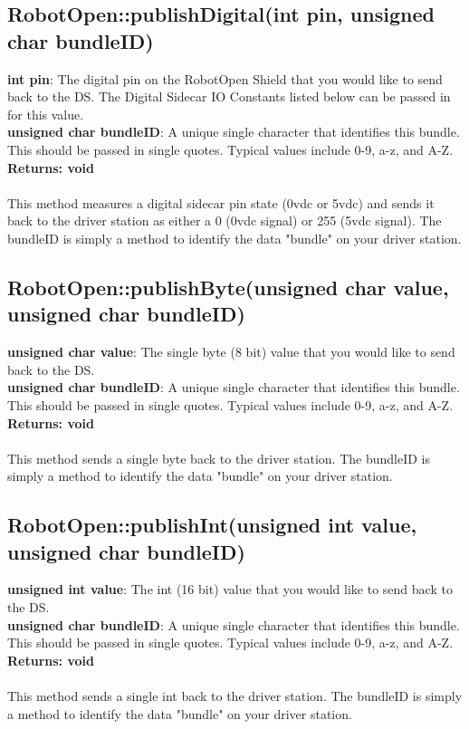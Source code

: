 \documentclass[11pt]{article} %
\begin{document}
\subsection{RobotOpen::publishDigital(int pin, unsigned char bundleID)}
\textbf{int pin}: The digital pin on the RobotOpen Shield that you would like to send back to the DS. The Digital Sidecar IO Constants listed below can be passed in for this value.\\
\textbf{unsigned char bundleID}: A unique single character that identifies this bundle. This should be passed in single quotes. Typical values include 0-9, a-z, and A-Z.\\
\textbf{Returns: void}\\\\
This method measures a digital sidecar pin state (0vdc or 5vdc) and sends it back to the driver station as either a 0 (0vdc signal) or 255 (5vdc signal). The bundleID is simply a method to identify the data "bundle" on your driver station.
\subsection{RobotOpen::publishByte(unsigned char value, unsigned char bundleID)}
\textbf{unsigned char value}: The single byte (8 bit) value that you would like to send back to the DS.\\
\textbf{unsigned char bundleID}: A unique single character that identifies this bundle. This should be passed in single quotes. Typical values include 0-9, a-z, and A-Z.\\
\textbf{Returns: void}\\\\
This method sends a single byte back to the driver station. The bundleID is simply a method to identify the data "bundle" on your driver station.
\subsection{RobotOpen::publishInt(unsigned int value, unsigned char bundleID)}
\textbf{unsigned int value}: The int (16 bit) value that you would like to send back to the DS.\\
\textbf{unsigned char bundleID}: A unique single character that identifies this bundle. This should be passed in single quotes. Typical values include 0-9, a-z, and A-Z.\\
\textbf{Returns: void}\\\\
This method sends a single int back to the driver station. The bundleID is simply a method to identify the data "bundle" on your driver station.
\newpage
\end{document}
